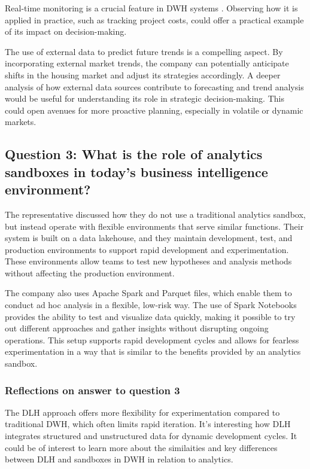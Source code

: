 Real-time monitoring is a crucial feature in DWH systems \cite[p. 1230]{CourseLitt}. Observing how it is applied in practice, such as tracking project costs, 
could offer a practical example of its impact on decision-making.

The use of external data to predict future trends is a compelling aspect. By incorporating external market trends, the company can potentially 
anticipate shifts in the housing market and adjust its strategies accordingly. A deeper analysis of how external data sources contribute to forecasting 
and trend analysis would be useful for understanding its role in strategic decision-making. This could open avenues for more proactive planning, 
especially in volatile or dynamic markets.

\subsection{Question 3: What is the role of analytics sandboxes in today's business intelligence environment?} 

The representative discussed how they do not use a traditional analytics sandbox, but instead operate with flexible environments that 
serve similar functions. Their system is built on a data lakehouse, and they maintain development, test, and production environments 
to support rapid development and experimentation. These environments allow teams to test new hypotheses and analysis methods without 
affecting the production environment.

The company also uses Apache Spark and Parquet files, which enable them to conduct ad hoc analysis in a flexible, low-risk way. The 
use of Spark Notebooks provides the ability to test and visualize data quickly, making it possible to try out different approaches and 
gather insights without disrupting ongoing operations. This setup supports rapid development cycles and allows for fearless experimentation 
in a way that is similar to the benefits provided by an analytics sandbox.
\subsubsection{Reflections on answer to question 3}

The DLH approach offers more flexibility for experimentation compared to traditional DWH, which often limits rapid iteration. 
It's interesting how DLH integrates structured and unstructured data for dynamic development cycles. It could be of interest
to learn more about the similaities and key differences between DLH and sandboxes in DWH in relation to analytics.

